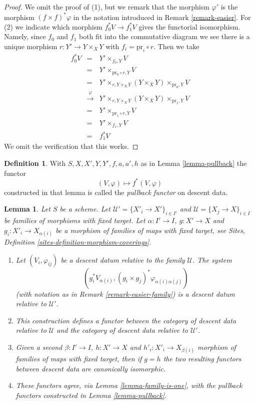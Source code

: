 \documentclass{stacks-project}
\theoremstyle{plain}
\newtheorem{lemma}[subsection]{Lemma}
\theoremstyle{definition}
\newtheorem{definition}[subsection]{Definition}
\theoremstyle{remark}
\numberwithin{equation}{subsection}
\begin{document}
\begin{proof}
We omit the proof of (1), but we remark that the morphism
$\varphi'$ is the morphism $(f \times f)^*\varphi$ in the
notation introduced in Remark \ref{remark-easier}.
For (2) we indicate which morphism
$f_0^*V \to f_1^*V$ gives the functorial isomorphism. Namely,
since $f_0$ and $f_1$ both fit into the commutative diagram
we see there is a unique morphism $r : Y' \to Y \times_X Y$
with $f_i = \text{pr}_i \circ r$. Then we take
\begin{eqnarray*}
f_0^*V & = &
Y' \times_{f_0, Y} V \\
& = &
Y' \times_{\text{pr}_0 \circ r, Y} V \\
& = &
Y' \times_{r, Y \times_X Y} (Y \times_X Y) \times_{\text{pr}_0, Y} V \\
& \xrightarrow{\varphi} &
Y' \times_{r, Y \times_X Y} (Y \times_X Y) \times_{\text{pr}_1, Y} V \\
& = &
Y' \times_{\text{pr}_1 \circ r, Y} V \\
& = &
Y' \times_{f_1, Y} V \\
& = & f_1^*V
\end{eqnarray*}
We omit the verification that this works.
\end{proof}

\begin{definition}
\label{definition-pullback-functor}
With $S, X, X', Y, Y', f, a, a', h$ as in Lemma \ref{lemma-pullback}
the functor
$$
(V, \varphi) \longmapsto f^*(V, \varphi)
$$
constructed in that lemma is called the {\it pullback functor} on descent data.
\end{definition}

\begin{lemma}
\label{lemma-pullback-family}
Let $S$ be a scheme. Let $\mathcal{U}' = \{X'_i \to X'\}_{i \in I'}$ and
$\mathcal{U} = \{X_j \to X\}_{i \in I}$ be families of morphisms with
fixed target. Let $\alpha : I' \to I$, $g : X' \to X$ and
$g_i : X'_i \to X_{\alpha(i)}$ be a morphism of families
of maps with fixed target, see
Sites, Definition \ref{sites-definition-morphism-coverings}.
\begin{enumerate}
\item Let $(V_i, \varphi_{ij})$ be a descent datum relative to the
family $\mathcal{U}$. The system
$$
\left(
g_i^*V_{\alpha(i)}, (g_i \times g_j)^*\varphi_{\alpha(i) \alpha(j)}
\right)
$$
(with notation as in Remark \ref{remark-easier-family})
is a descent datum relative to $\mathcal{U}'$.
\item This construction defines a functor between the category of
descent data relative to $\mathcal{U}$ and the category of
descent data relative to $\mathcal{U}'$.
\item Given a second $\beta : I' \to I$, $h : X' \to X$ and
$h'_i : X'_i \to X_{\beta(i)}$ morphism of families
of maps with fixed target, then if $g = h$ the two resulting functors
between descent data are canonically isomorphic.
\item These functors agree, via Lemma \ref{lemma-family-is-one},
with the pullback functors constructed in Lemma \ref{lemma-pullback}.
\end{enumerate}
\end{lemma}
\end{document}

